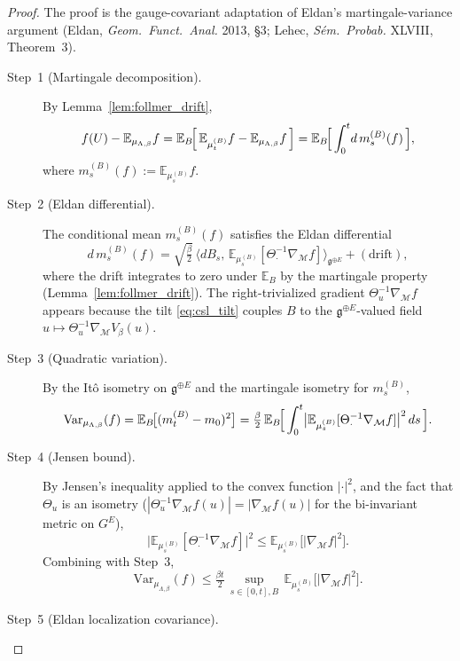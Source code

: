 \begin{proof}
The proof is the gauge-covariant adaptation of Eldan's
martingale-variance argument (Eldan, \emph{Geom.\ Funct.\ Anal.} 2013,
§3; Lehec, \emph{S\'em.\ Probab.} XLVIII, Theorem~3).
\begin{description}
\item[Step~1 (Martingale decomposition).]
By Lemma~\ref{lem:follmer_drift},
\[
  f(U)-\mathbb{E}_{\mu_{\Lambda,\beta}}f
  = \mathbb{E}_{B}\!\Bigl[\,
    \mathbb{E}_{\mu_{t}^{(B)}}f - \mathbb{E}_{\mu_{\Lambda,\beta}}f
  \,\Bigr]
  = \mathbb{E}_{B}\!\Bigl[\,
    \int_{0}^{t}\!
      d\,m_{s}^{(B)}(f)
  \,\Bigr],
\]
where $m_{s}^{(B)}(f):=\mathbb{E}_{\mu_{s}^{(B)}}f$.
\item[Step~2 (Eldan differential).]
The conditional mean $m_{s}^{(B)}(f)$ satisfies the Eldan differential
\[
  d\,m_{s}^{(B)}(f)
  = \sqrt{\tfrac{\beta}{2}}\,
    \bigl\langle dB_{s},\,
      \mathbb{E}_{\mu_{s}^{(B)}}[\Theta_{\cdot}^{-1}\nabla_{\mathcal{M}}f]\bigr\rangle_{\mathfrak{g}^{\oplus E}}
    + (\text{drift}),
\]
where the drift integrates to zero under $\mathbb{E}_{B}$ by the
martingale property (Lemma~\ref{lem:follmer_drift}). The
right-trivialized gradient $\Theta_{u}^{-1}\nabla_{\mathcal{M}}f$
appears because the tilt \eqref{eq:csl_tilt} couples $B$ to the
$\mathfrak{g}^{\oplus E}$-valued field
$u\mapsto\Theta_{u}^{-1}\nabla_{\mathcal{M}}V_{\beta}(u)$.
\item[Step~3 (Quadratic variation).]
By the It\^o isometry on $\mathfrak{g}^{\oplus E}$ and the
martingale isometry for $m_{s}^{(B)}$,
\[
  \mathrm{Var}_{\mu_{\Lambda,\beta}}(f)
  = \mathbb{E}_{B}\!\bigl[(m_{t}^{(B)}-m_{0})^{2}\bigr]
  = \tfrac{\beta}{2}\,
    \mathbb{E}_{B}\!\Bigl[\,
      \int_{0}^{t}
        \bigl|\mathbb{E}_{\mu_{s}^{(B)}}[\Theta_{\cdot}^{-1}\nabla_{\mathcal{M}}f]\bigr|^{2}
      \,ds
    \,\Bigr].
\]
\item[Step~4 (Jensen bound).]
By Jensen's inequality applied to the convex function $|\cdot|^{2}$,
and the fact that $\Theta_{u}$ is an isometry
($|\Theta_{u}^{-1}\nabla_{\mathcal{M}}f(u)|=|\nabla_{\mathcal{M}}f(u)|$
for the bi-invariant metric on $G^{E}$),
\[
  \bigl|\mathbb{E}_{\mu_{s}^{(B)}}[\Theta_{\cdot}^{-1}\nabla_{\mathcal{M}}f]\bigr|^{2}
  \le
  \mathbb{E}_{\mu_{s}^{(B)}}\!\bigl[|\nabla_{\mathcal{M}}f|^{2}\bigr].
\]
Combining with Step~3,
\[
  \mathrm{Var}_{\mu_{\Lambda,\beta}}(f)
  \le \tfrac{\beta t}{2}\,
    \sup_{s\in[0,t],B}\,
    \mathbb{E}_{\mu_{s}^{(B)}}\!\bigl[|\nabla_{\mathcal{M}}f|^{2}\bigr].
\]
\item[Step~5 (Eldan localization covariance).]

\end{description}
\end{proof}
